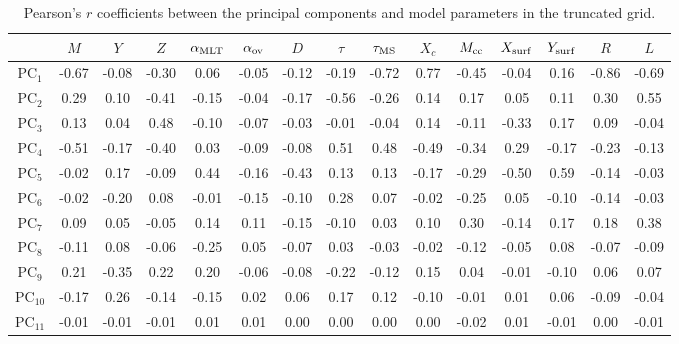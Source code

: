 {\begin{landscape}
\begin{table} %
\centering
\caption{Pearson's $r$ coefficients between the principal components and model parameters in the truncated grid.}
\label{tab:mcoefs}
\hspace*{-0.5cm}
\begin{tabular}{c|cccccccccccccc}
    &$M$   & $Y$         & $Z$         & $\alpha_{\rm{MLT}}$     & $\alpha_{\rm{ov}}$ & $D$ & $\tau$      & $\tau_{\rm{MS}}$     & $X_c$      & $M_{\rm{cc}}$  & $X_{\rm{surf}}$   & $Y_{\rm{surf}}$   & $R$    & $L$                  \\ \hline \hline
PC$_1$  & -0.67 & -0.08 & -0.30 & 0.06      & -0.05     & -0.12 & -0.19 & -0.72 & 0.77     & -0.45   & -0.04   & 0.16   & -0.86 & -0.69 \\
PC$_2$  & 0.29  & 0.10  & -0.41 & -0.15     & -0.04     & -0.17 & -0.56 & -0.26 & 0.14     & 0.17    & 0.05    & 0.11   & 0.30  & 0.55  \\
PC$_3$  & 0.13  & 0.04  & 0.48  & -0.10     & -0.07     & -0.03 & -0.01 & -0.04 & 0.14     & -0.11   & -0.33   & 0.17   & 0.09  & -0.04 \\
PC$_4$  & -0.51 & -0.17 & -0.40 & 0.03      & -0.09     & -0.08 & 0.51  & 0.48  & -0.49    & -0.34   & 0.29    & -0.17  & -0.23 & -0.13 \\
PC$_5$  & -0.02 & 0.17  & -0.09 & 0.44      & -0.16     & -0.43 & 0.13  & 0.13  & -0.17    & -0.29   & -0.50   & 0.59   & -0.14 & -0.03 \\
PC$_6$  & -0.02 & -0.20 & 0.08  & -0.01     & -0.15     & -0.10 & 0.28  & 0.07  & -0.02    & -0.25   & 0.05    & -0.10  & -0.14 & -0.03 \\
PC$_7$  & 0.09  & 0.05  & -0.05 & 0.14      & 0.11      & -0.15 & -0.10 & 0.03  & 0.10     & 0.30    & -0.14   & 0.17   & 0.18  & 0.38  \\
PC$_8$  & -0.11 & 0.08  & -0.06 & -0.25     & 0.05      & -0.07 & 0.03  & -0.03 & -0.02    & -0.12   & -0.05   & 0.08   & -0.07 & -0.09 \\
PC$_9$  & 0.21  & -0.35 & 0.22  & 0.20      & -0.06     & -0.08 & -0.22 & -0.12 & 0.15     & 0.04    & -0.01   & -0.10  & 0.06  & 0.07  \\
PC$_{10}$ & -0.17 & 0.26  & -0.14 & -0.15     & 0.02      & 0.06  & 0.17  & 0.12  & -0.10    & -0.01   & 0.01    & 0.06   & -0.09 & -0.04 \\
PC$_{11}$ & -0.01 & -0.01 & -0.01 & 0.01      & 0.01      & 0.00  & 0.00  & 0.00  & 0.00     & -0.02   & 0.01    & -0.01  & 0.00  & -0.01 \\ \hline
\end{tabular} 
\end{table}
\end{landscape}
}


